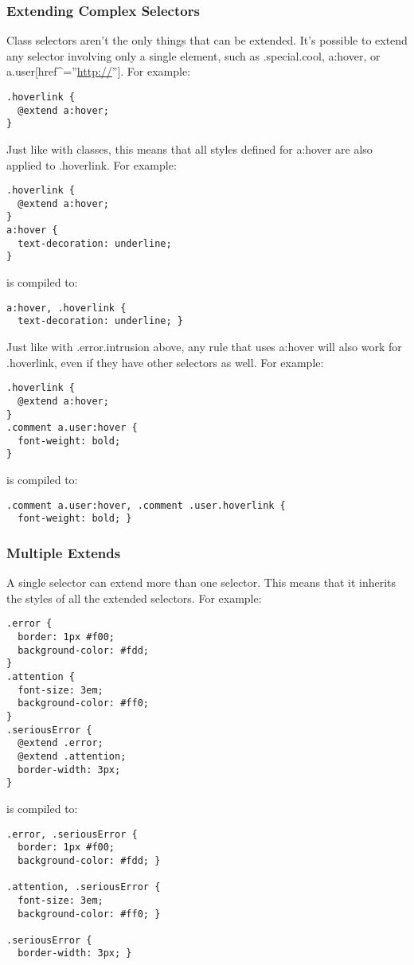 \documentclass[10pt]{article}
\begin{document}
\subsubsection{Extending Complex Selectors}


 Class selectors aren’t the only things that can be extended. It’s possible to extend any selector involving only a single element, such as .special.cool, a:hover, or a.user[href\^{}=''\url{http://}'']. For example:
\begin{verbatim}
.hoverlink {
  @extend a:hover;
}
\end{verbatim}


 Just like with classes, this means that all styles defined for a:hover are also applied to .hoverlink. For example:
\begin{verbatim}
.hoverlink {
  @extend a:hover;
}
a:hover {
  text-decoration: underline;
}
\end{verbatim}


 is compiled to:
\begin{verbatim}
a:hover, .hoverlink {
  text-decoration: underline; }
\end{verbatim}


 Just like with .error.intrusion above, any rule that uses a:hover will also work for .hoverlink, even if they have other selectors as well. For example:
\begin{verbatim}
.hoverlink {
  @extend a:hover;
}
.comment a.user:hover {
  font-weight: bold;
}
\end{verbatim}


 is compiled to:
\begin{verbatim}
.comment a.user:hover, .comment .user.hoverlink {
  font-weight: bold; }
\end{verbatim}
\subsubsection{Multiple Extends}


 A single selector can extend more than one selector. This means that it inherits the styles of all the extended selectors. For example:
\begin{verbatim}
.error {
  border: 1px #f00;
  background-color: #fdd;
}
.attention {
  font-size: 3em;
  background-color: #ff0;
}
.seriousError {
  @extend .error;
  @extend .attention;
  border-width: 3px;
}
\end{verbatim}


 is compiled to:
\begin{verbatim}
.error, .seriousError {
  border: 1px #f00;
  background-color: #fdd; }

.attention, .seriousError {
  font-size: 3em;
  background-color: #ff0; }

.seriousError {
  border-width: 3px; }
\end{verbatim}
\end{document}
